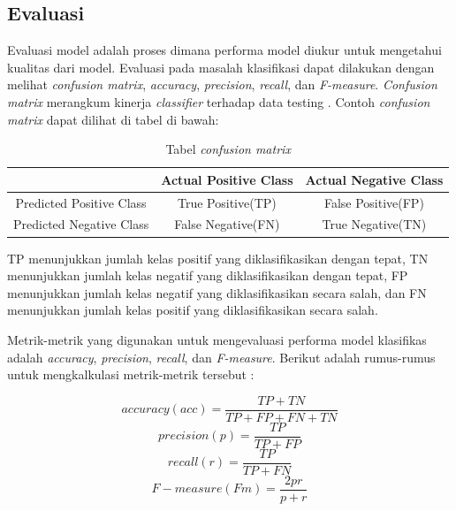 \documentclass{article}
\begin{document}
   	\subsection{Evaluasi}
   	Evaluasi model adalah proses dimana performa model diukur untuk mengetahui kualitas dari model. Evaluasi pada masalah klasifikasi dapat dilakukan dengan melihat \textit{confusion matrix}, \textit{accuracy}, \textit{precision}, \textit{recall}, dan \textit{F-measure}. \textit{Confusion matrix} merangkum kinerja \textit{classifier} terhadap data testing \cite{hossin}. Contoh \textit{confusion matrix} dapat dilihat di tabel di bawah:
   	
   	\begin{table}[H]
   	\begin{center}
   		\begin{tabular}{|c|c|c|}
   			\hline
   			& Actual Positive Class & Actual Negative Class \\
   			\hline
   			Predicted Positive Class & True Positive(TP) & False Positive(FP) \\
   			\hline
   			Predicted Negative Class & False Negative(FN) & True Negative(TN) \\
   			\hline
   		\end{tabular}
   		\caption{Tabel \textit{confusion matrix}}
   	\end{center}
	\end{table}
   	\par
   	TP menunjukkan jumlah kelas positif yang diklasifikasikan dengan tepat, TN menunjukkan jumlah kelas negatif yang diklasifikasikan dengan tepat, FP menunjukkan jumlah kelas negatif yang diklasifikasikan secara salah, dan FN menunjukkan jumlah kelas positif yang diklasifikasikan secara salah.
   	\par
   	Metrik-metrik yang digunakan untuk mengevaluasi performa model klasifikas adalah \textit{accuracy}, \textit{precision}, \textit{recall}, dan \textit{F-measure}. Berikut adalah rumus-rumus untuk mengkalkulasi metrik-metrik tersebut :
   	
   	\begin{equation}
   		accuracy(acc) = \frac{TP + TN}{TP + FP + FN + TN}
   	\end{equation}
   	\begin{equation}
   		precision(p) = \frac{TP}{TP + FP}
   	\end{equation}
   	\begin{equation}
   		recall(r) = \frac{TP}{TP + FN}
   	\end{equation}
   	\begin{equation}
   		F-measure(Fm) = \frac{2pr}{p + r}
   	\end{equation}
   \newpage
\end{document}
